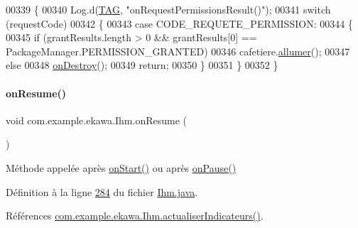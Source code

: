 \begin{DoxyCode}
00339     \{
00340         Log.d(\hyperlink{classcom_1_1example_1_1ekawa_1_1_ihm_a95cd92c2acaf9f8982302da08d94f9aa}{TAG}, \textcolor{stringliteral}{"onRequestPermissionsResult()"});
00341         \textcolor{keywordflow}{switch} (requestCode)
00342         \{
00343             \textcolor{keywordflow}{case} CODE\_REQUETE\_PERMISSION:
00344             \{
00345                 \textcolor{keywordflow}{if} (grantResults.length > 0 && grantResults[0] == PackageManager.PERMISSION\_GRANTED)
00346                     cafetiere.\hyperlink{classcom_1_1example_1_1ekawa_1_1_cafetiere_afa405dc114a82fe74c06ff0971fa6cfc}{allumer}();
00347                 \textcolor{keywordflow}{else}
00348                     \hyperlink{classcom_1_1example_1_1ekawa_1_1_ihm_a5ae27969ec39afede5d0cd36b469f145}{onDestroy}();
00349                 \textcolor{keywordflow}{return};
00350             \}
00351         \}
00352     \}
\end{DoxyCode}
\mbox{\label{classcom_1_1example_1_1ekawa_1_1_ihm_aec9b38c2990ae4bdee8df0b49253120f}} 
\paragraph{\texorpdfstring{on\+Resume()}{onResume()}}
{\footnotesize\ttfamily void com.\+example.\+ekawa.\+Ihm.\+on\+Resume (\begin{DoxyParamCaption}{ }\end{DoxyParamCaption})\hspace{0.3cm}{\ttfamily [protected]}}



Méthode appelée après \hyperlink{classcom_1_1example_1_1ekawa_1_1_ihm_a5cf91e6625760cbdca208988a08e86f6}{on\+Start()} ou après \hyperlink{classcom_1_1example_1_1ekawa_1_1_ihm_a4cf2ee6861e571d2634a4dd2492e9be9}{on\+Pause()} 



Définition à la ligne \hyperlink{_ihm_8java_source_l00284}{284} du fichier \hyperlink{_ihm_8java_source}{Ihm.\+java}.



Références \hyperlink{_ihm_8java_source_l00855}{com.\+example.\+ekawa.\+Ihm.\+actualiser\+Indicateurs()}.


